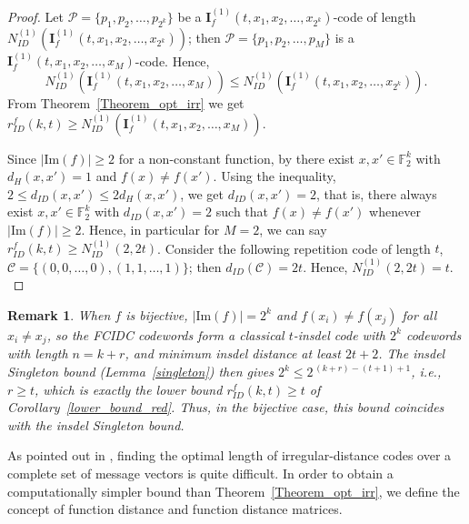 \documentclass[11 pt]{article}
\numberwithin{equation}{section}
\newtheorem{remark}[theorem]{Remark}
\begin{document}
    \begin{proof}
         Let $\mathcal{P}=\{p_1, p_2, \ldots, p_{2^k}\}$ be a $\boldsymbol{I}_f^{(1)}(t, x_1,x_2, \ldots,x_{2^k})$-code of length $N^{(1)}_{ID}(\boldsymbol{I}_f^{(1)}(t, x_1,x_2, \ldots,x_{2^k}))$; then $\mathcal{P}=\{p_1, p_2, \ldots, p_{M}\}$ is a $\boldsymbol{I}_f^{(1)}(t, x_1,x_2, \ldots,x_{M})$-code. Hence, $$N^{(1)}_{ID}(\boldsymbol{I}_f^{(1)}(t, x_1,x_2, \ldots,x_{M})) \leq N^{(1)}_{ID}(\boldsymbol{I}_f^{(1)}(t, x_1,x_2, \ldots,x_{2^k})).$$ From Theorem~\ref{Theorem_opt_irr} we get $r^f_{ID}(k, t) \geq N^{(1)}_{ID}(\boldsymbol{I}_f^{(1)}(t, x_1,x_2, \ldots,x_{M})).$
         
        \medskip
        \noindent Since $|\mathrm{Im}(f)| \geq 2$ for a non-constant function, by \cite[Corollary 1]{10132545} there exist $x, x' \in \mathbb{F}_2^k$ with $d_H(x,x') = 1$ and $f(x) \neq f(x')$. Using the inequality, $2 \leq d_{ID}(x, x') \leq 2d_H(x,x')$, we get $d_{ID}(x,x') = 2$, that is, there always exist $x, x' \in \mathbb{F}_2^k$ with $d_{ID}(x,x') = 2$ such that $f(x) \neq f(x')$ whenever $|\mathrm{Im}{(f)}| \geq 2.$ Hence, in particular for $M = 2$, we can say $r^f_{ID}(k, t) \geq N^{(1)}_{ID}(2, 2t)$. Consider the following repetition code of length $t$, $\mathcal{C} = \{(0,0, \ldots, 0), (1,1, \ldots, 1)\}$; then $d_{ID}(\mathcal{C}) = 2t$. Hence, $N^{(1)}_{ID}(2, 2t) = t.$
    \end{proof}

    \begin{remark}\label{rmk:singleton-bij}
    When $f$ is bijective, $|\mathrm{Im}(f)| = 2^k$ and $f(x_i)\neq f(x_j)$ for all $x_i \neq x_j$, so the FCIDC codewords form a classical $t$-insdel code with $2^k$ codewords with length $n = k+r$, and minimum insdel distance at least $2t+2$. The insdel Singleton bound (Lemma~\ref{singleton}) then gives $2^k \le 2^{\,(k+r)-(t+1)+1}$, i.e., \ $r \ge t$, which is exactly the lower bound $r^f_{ID}(k,t)\ge t$ of Corollary~\ref{lower_bound_red}. Thus, in the bijective case, this bound coincides with the insdel Singleton bound.
    \end{remark}
    As pointed out in \cite{10132545}, finding the optimal length of irregular-distance codes over a complete set of message vectors is quite difficult. In order to obtain a computationally simpler bound than Theorem~\ref{Theorem_opt_irr}, we define the concept of function distance and function distance matrices.
    
\end{document}

